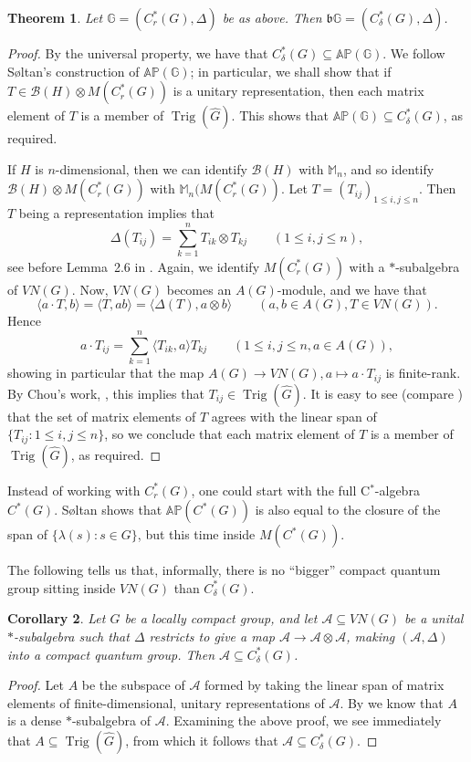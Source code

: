 \documentclass[twoside,a4paper]{article}
\newtheorem{theorem}{Theorem}[section]
\newtheorem{corollary}[theorem]{Corollary}
\theoremstyle{definition}
\theoremstyle{remark}
\newcommand{\AP}{{\mathbb{AP}}}
\newcommand{\Trig}{{\operatorname{Trig}}}
\newcommand{\mc}{\mathcal}
\newcommand{\mf}{\mathfrak}
\newcommand{\ip}[2]{\langle{#1},{#2}\rangle}
\begin{document}
\begin{theorem}
Let $\mathbb G = (C^*_r(G),\Delta)$ be as above.  Then $\mf b\mathbb G = (C^*_\delta(G),\Delta)$.
\end{theorem}
\begin{proof}
By the universal property, we have that $C^*_\delta(G) \subseteq \AP(\mathbb G)$.
We follow S{\o}ltan's construction of $\AP(\mathbb G)$; in particular, we shall show
that if $T\in\mc B(H)\otimes M(C^*_r(G))$ is a unitary representation, then each
matrix element of $T$ is a member of $\Trig(\hat G)$.  This shows that $\AP(\mathbb G)
\subseteq C^*_\delta(G)$, as required.

If $H$ is $n$-dimensional, then we can identify $\mc B(H)$ with $\mathbb M_n$,
and so identify $\mc B(H)\otimes M(C^*_r(G))$ with $\mathbb M_n(M(C^*_r(G))$.
Let $T=(T_{ij})_{1\leq i,j\leq n}$.  Then $T$ being a representation implies that
\[ \Delta(T_{ij}) = \sum_{k=1}^n T_{ik}\otimes T_{kj} \qquad (1\leq i,j\leq n), \]
see before Lemma~2.6 in \cite{soltan}.  Again, we identify $M(C^*_r(G))$ with a
$*$-subalgebra of $VN(G)$.  Now, $VN(G)$ becomes an $A(G)$-module, and we have that
\[ \ip{a\cdot T}{b} = \ip{T}{ab} = \ip{\Delta(T)}{a\otimes b} \qquad (a,b\in A(G), T\in VN(G)). \]
Hence
\[ a\cdot T_{ij} = \sum_{k=1}^n \ip{T_{ik}}{a} T_{kj} \qquad (1\leq i,j\leq n, a\in A(G)), \]
showing in particular that the map $A(G)\rightarrow VN(G), a\mapsto a\cdot T_{ij}$
is finite-rank.  By Chou's work, \cite[Proposition~2.3]{chou}, this implies that
$T_{ij}\in\Trig(\hat G)$.  It is easy to see (compare \cite[Lemma~2.6]{soltan}) that
the set of matrix elements of $T$ agrees with the linear span of $\{ T_{ij} : 
1\leq i,j\leq n\}$, so we conclude that each matrix element of $T$ is a member of
$\Trig(\hat G)$, as required.
\end{proof}

Instead of working with $C^*_r(G)$, one could start with the full C$^*$-algebra
$C^*(G)$.  S{\o}ltan shows that $\AP(C^*(G))$ is also equal to the closure of
the span of $\{\lambda(s) : s\in G\}$, but this time inside $M(C^*(G))$.

The following tells us that, informally, there is no ``bigger'' compact quantum
group sitting inside $VN(G)$ than $C^*_\delta(G)$.

\begin{corollary}
Let $G$ be a locally compact group, and let $\mc A \subseteq VN(G)$ be a unital
$*$-subalgebra such that $\Delta$ restricts to give a map $\mc A \rightarrow
\mc A \otimes \mc A$, making $(\mc A,\Delta)$ into a compact quantum group.
Then $\mc A \subseteq C^*_\delta(G)$.
\end{corollary}
\begin{proof}
Let $A$ be the subspace of $\mc A$ formed by taking the linear span of matrix
elements of finite-dimensional, unitary representations of $\mc A$.  By
\cite[Theorem~2.2]{woro1} we know that $A$ is a dense $*$-subalgebra of $\mc A$.
Examining the above proof, we see immediately that $A \subseteq \Trig(\hat G)$,
from which it follows that $\mc A \subseteq C^*_\delta(G)$.
\end{proof}
\end{document}
